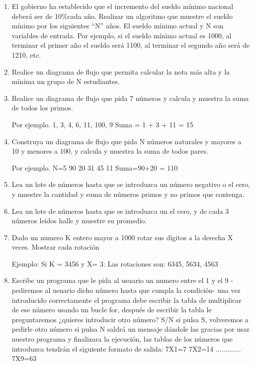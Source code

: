 \documentclass{scrartcl}
\begin{document}
\begin{enumerate}
		\item El gobierno ha establecido que el incremento del sueldo mínimo nacional deberá ser de 10\%cada año. Realizar un algoritmo que muestre el sueldo mínimo por los siguientes “N” años. El sueldo mínimo actual y N son variables de entrada.	Por ejemplo, si el sueldo mínimo actual es 1000, al terminar el primer año el sueldo será 1100, al terminar el segundo año será de 1210, etc.
		
		\item Realice un diagrama de flujo que permita calcular la nota más alta y la mínima un grupo de N estudiantes.
		
		\item Realice un diagrama de flujo que pida 7 números y calcula y muestra la suma de todos los primos.
		
		Por ejemplo. 1, 3, 4, 6, 11, 100, 9
		Suma = 1 + 3 + 11 = 15
		
		\item Construya un diagrama de flujo que pida N números naturales y mayores a 10 y menores a 100, y calcula y muestra la suma de todos pares.
		
		Por ejemplo. N=5 90 20 31 45 11
		Suma=90+20 = 110
		
		\item Lea un lote de números hasta que se introduzca un número negativo o el cero, y muestre la cantidad y suma de números primos y no primos que contenga.
		
		\item Lea un lote de números hasta que se introduzca un el cero, y de cada 3 números leídos halle y muestre su promedio.
		
		\item Dado un numero K entero mayor a 1000 rotar sus dígitos a la derecha X veces. Mostrar cada rotación
		
		Ejemplo: Si K = 3456 y X= 3:
		Las rotaciones son: 6345, 5634, 4563
		
		\item Escribe un programa que le pida al usuario un numero entre el 1 y el 9 - pediremos al usuario dicho número hasta que cumpla la condición- una vez introducido	correctamente el programa debe escribir la tabla de multiplicar de ese número usando un bucle for, después de escribir la tabla le preguntaremos ¿quieres introducir otro número? S/N si pulsa S, volveremos a pedirle otro número si pulsa N saldrá un mensaje dándole las gracias por usar nuestro programa y finalizara la ejecución, las tablas de los números que introduzca tendrán el siguiente formato de	salida: 7X1=7 7X2=14 ............. 7X9=63
		

\end{enumerate}
\end{document}
